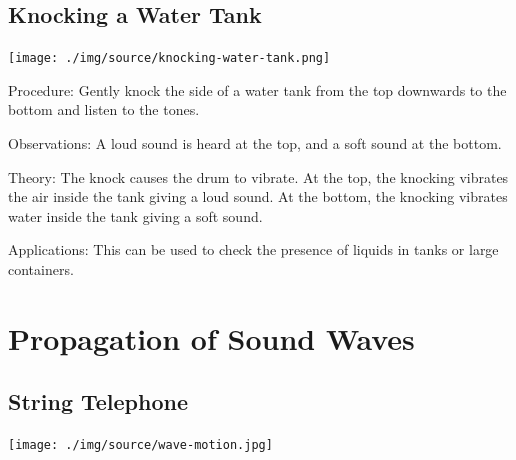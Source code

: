 \begin{multicols}{2}
\subsection{Knocking a Water Tank}

\begin{center}
\texttt{[image: ./img/source/knocking-water-tank.png]}
\end{center}

\begin{description*}
\item[Procedure:]{Gently knock the side of a water tank from the top downwards to the bottom and listen to the tones.}
\item[Observations:]{A loud sound is heard at the top, and a soft sound at the bottom.}
\item[Theory:]{The knock causes the drum to vibrate. At the top, the knocking vibrates the air inside the tank giving a loud sound. At the bottom, the knocking vibrates water inside the tank giving a soft sound.}
\item[Applications:]{This can be used to check the presence of liquids in tanks or large containers.}
\end{description*}


\section*{Propagation of Sound Waves}


\subsection{String Telephone}

\begin{center}
\texttt{[image: ./img/source/wave-motion.jpg]}
\end{center}


\end{multicols}
